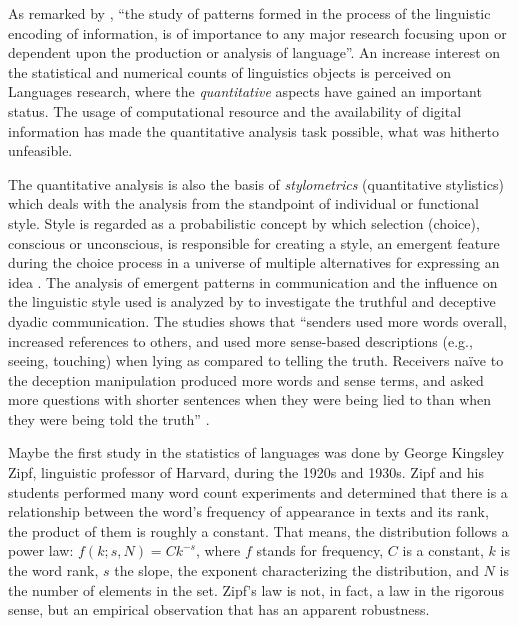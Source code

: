 As remarked by \cite{sedelow1966}, ``the study of patterns formed in the process of the
linguistic encoding of information, is of importance to any major research focusing upon
or dependent upon the production or analysis of language''. An increase interest on
the statistical and numerical counts of linguistics objects is perceived on Languages research,
where the \textit{quantitative} aspects have gained an important status. The usage of 
computational resource and the availability of digital information has made the quantitative analysis 
task possible, what was hitherto unfeasible.

The quantitative analysis is also the basis of \textit{stylometrics} (quantitative stylistics)
which deals with the analysis from the standpoint of individual or functional style.
Style is regarded as a probabilistic concept by which selection
(choice), conscious or unconscious, is responsible for creating a style,
an emergent feature during the choice process in a universe of multiple
alternatives for expressing an idea \citep{tuldava2004}.
The analysis of emergent patterns in communication and the influence on the linguistic style 
used is analyzed by \cite{hancock2004} to investigate the truthful and deceptive
dyadic communication. The studies shows that ``senders used more words overall,
increased references to others, and used more sense-based descriptions (e.g., seeing, touching) when lying as compared
to telling the truth. Receivers naïve to the deception manipulation produced more words and sense terms, and
asked more questions with shorter sentences when they were being lied to than when they were being told the truth''
\citep{hancock2004}.



Maybe the first study in the statistics of languages was done by George Kingsley Zipf, 
linguistic professor of Harvard, during the 1920s and 1930s. Zipf and his students performed many 
word count experiments and determined that there is a relationship between the word's frequency of 
appearance in texts and its rank, the product of them is roughly a constant. 
That means, the distribution follows a power law: $f(k;s,N) = C k^{-s}$, where $f$ stands for frequency, 
$C$ is a constant, $k$ is the word rank, $s$ the slope, the exponent characterizing the distribution, 
and $N$ is the number of elements in the set. Zipf's law is not, in fact, a law in the rigorous
sense, but an empirical observation that has an apparent robustness.

